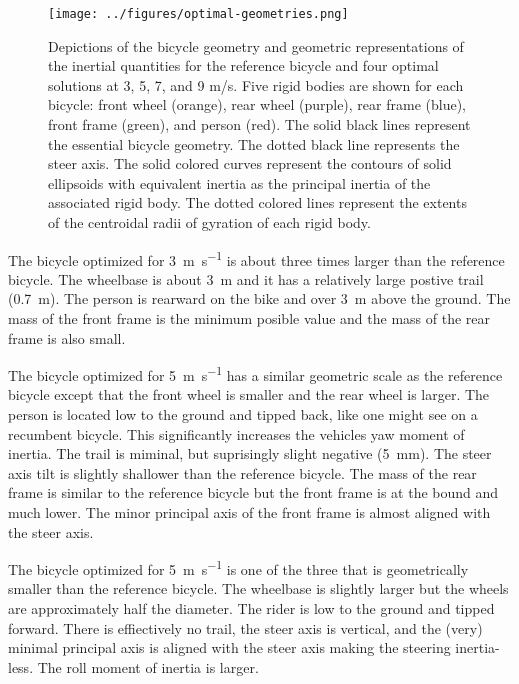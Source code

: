 \documentclass{bmd2019p}
\begin{document}
%
\begin{figure}
  \centering
  \texttt{[image: ../figures/optimal-geometries.png]}
  \label{fig:optimal-geometries}
  \caption{Depictions of the bicycle geometry and geometric representations of
    the inertial quantities for the reference bicycle and four optimal solutions
    at 3, 5, 7, and 9 m/s. Five rigid bodies are shown for each bicycle: front
    wheel (orange), rear wheel (purple), rear frame (blue), front frame
    (green), and person (red). The solid black lines represent the essential
    bicycle geometry. The dotted black line represents the steer axis. The
    solid colored curves represent the contours of solid ellipsoids with
    equivalent inertia as the principal inertia of the associated rigid body.
    The dotted colored lines represent the extents of the centroidal radii of
    gyration of each rigid body.}
\end{figure}

The bicycle optimized for 3~\si{\meter\per\second} is about three times larger
than the reference bicycle. The wheelbase is about 3~\si{\meter} and it has a
relatively large postive trail (0.7~\si{\meter}). The person is rearward on the
bike and over 3~\si{\meter} above the ground. The mass of the front frame is
the minimum posible value and the mass of the rear frame is also small.

The bicycle optimized for 5~\si{\meter\per\second} has a similar geometric
scale as the reference bicycle except that the front wheel is smaller and the
rear wheel is larger. The person is located low to the ground and tipped back,
like one might see on a recumbent bicycle.  This significantly increases the
vehicles yaw moment of inertia. The trail is miminal, but suprisingly slight
negative (5~\si{\milli\meter}). The steer axis tilt is slightly shallower than
the reference bicycle. The mass of the rear frame is similar to the reference
bicycle but the front frame is at the bound and much lower. The minor principal
axis of the front frame is almost aligned with the steer axis.

The bicycle optimized for 5~\si{\meter\per\second} is one of the three that is
geometrically smaller than the reference bicycle. The wheelbase is slightly
larger but the wheels are approximately half the diameter. The rider is low to
the ground and tipped forward. There is effiectively no trail, the steer axis
is vertical, and the (very) minimal principal axis is aligned with the steer
axis making the steering inertia-less. The roll moment of inertia is larger.
\end{document}
